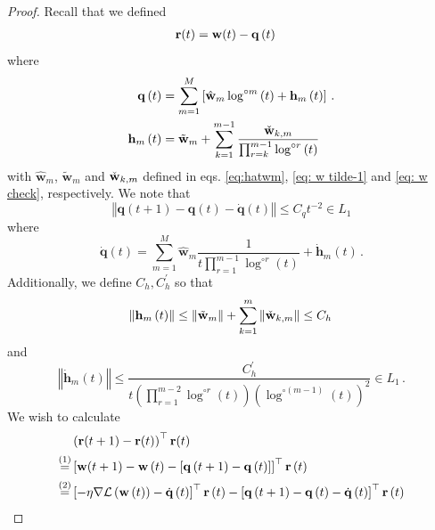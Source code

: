 \documentclass[twoside,11pt,english]{article}
\begin{document}
\begin{proof}
Recall that we defined
\begin{align}
\mathbf{r}(t) & =\mathbf{w}(t)-\mathbf{q}\left(t\right)\label{eq: define r(t) degenrate 2}
\end{align}
where
\begin{align}
\mathbf{q}\left(t\right) & =\sum_{m=1}^{M}\left[\hat{\mathbf{w}}_{m}\log^{\circ m}\left(t\right)+\mathbf{h}_{m}\left(t\right)\right]\,.\label{eq: q(t)}\\
\mathbf{h}_{m}\left(t\right) & =\tilde{\mathbf{w}}_{m}+\sum_{k=1}^{m-1}\frac{\check{\mathbf{w}}_{k,m}}{\prod_{r=k}^{m-1}\log^{\circ r}\left(t\right)}\label{eq: h_m}
\end{align}
with $\hat{\mathbf{w}}_{m}$, $\tilde{\mathbf{w}}_{m}$ and $\check{\mathbf{w}}_{k,m}$
defined in eqs. \ref{eq:hatwm}, \ref{eq: w tilde-1} and \ref{eq: w check},
respectively. We note that
\begin{equation}
\left\Vert \mathbf{q}\left(t+1\right)-\mathbf{q}\left(t\right)-\dot{\mathbf{q}}\left(t\right)\right\Vert \leq C_{q}t^{-2}\in L_1\label{eq: q second derivative}
\end{equation}
where
\begin{equation}
\dot{\mathbf{q}}\left(t\right)=\sum_{m=1}^{M}\hat{\mathbf{w}}_{m}\frac{1}{t\prod_{r=1}^{m-1}\log^{\circ r}\left(t\right)}+\dot{\mathbf{h}}_{m}\left(t\right)\,.\label{eq: q dot}
\end{equation}
Additionally, we define $C_{h},C_{h}^{\prime}$ so that 
\begin{equation}
\left\Vert \mathbf{h}_{m}\left(t\right)\right\Vert \leq\left\Vert \tilde{\mathbf{w}}_{m}\right\Vert +\sum_{k=1}^{m}\left\Vert \check{\mathbf{w}}_{k,m}\right\Vert \leq C_{h}\,\label{eq: h bound}
\end{equation}
and 
\begin{equation}
\left\Vert \dot{\mathbf{h}}_{m}\left(t\right)\right\Vert \leq\frac{C_{h}^{\prime}}{t\left(\prod_{r=1}^{m-2}\log^{\circ r}\left(t\right)\right)\left(\log^{\circ (m-1)}\left(t\right)\right)^{2}}\in L_1\,.\label{eq: h dot bound}
\end{equation}
We wish to calculate 
\begin{align}
 & \left(\rvec(t+1)-\rvec(t)\right)^{\top}\rvec(t)\nonumber \\
\overset{\left(1\right)}{=} & \left[\wvec(t+1)-\mathbf{w}\left(t\right)-\left[\mathbf{q}\left(t+1\right)-\mathbf{q}\left(t\right)\right]\right]^{\top}\mathbf{r}\left(t\right)\nonumber \\
\overset{\left(2\right)}{=} & \left[-\eta\derL-\dot{\mathbf{q}}\left(t\right)\right]^{\top}\mathbf{r}\left(t\right)-\left[\mathbf{q}\left(t+1\right)-\mathbf{q}\left(t\right)-\dot{\mathbf{q}}\left(t\right)\right]^{\top}\mathbf{r}\left(t\right)\label{eq: r correlation}

\end{align}
\end{proof}
\end{document}
